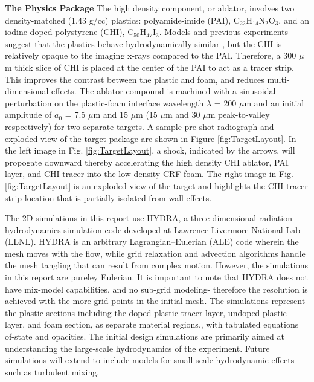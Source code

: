 \noindent \textbf{The Physics Package} The high density component, or ablator,  involves two density-matched (1.43 g/cc) plastics: polyamide-imide (PAI), C$_{22}$H$_{14}$N$_2$O$_3$, and an iodine-doped polystyrene (CHI), C$_{50}$H$_{47}$I$_3$.  Models and previous experiments suggest that the plastics behave hydrodynamically similar \cite{Nagel:2017}, but the CHI is relatively opaque to the imaging x-rays compared to the PAI.  Therefore, a 300 $\mu$m thick slice of CHI is placed at the center of the PAI to act as a tracer strip. This improves the contrast between the plastic and foam, and reduces multi-dimensional effects. The ablator compound is machined with a sinusoidal perturbation on the plastic-foam interface wavelength $\lambda$ = 200 $\mu$m and an initial amplitude of  $a_0$ =  7.5 $\mu$m and 15 $\mu$m  (15 $\mu$m and 30 $\mu$m peak-to-valley respectively) for two separate targets. A sample pre-shot radiograph and exploded view of the target package are shown in Figure \ref{fig:TargetLayout}.  In the left image in Fig. \ref{fig:TargetLayout}, a shock, indicated by the arrows, will propogate downward thereby accelerating the high density CHI ablator, PAI layer, and CHI tracer into the low density CRF foam.  The right image in Fig. \ref{fig:TargetLayout} is an exploded view of the target and highlights the CHI tracer strip location that is partially isolated from wall effects.



The 2D simulations in this report use HYDRA, a three-dimensional radiation hydrodynamics simulation code developed at Lawrence Livermore National Lab (LLNL).   HYDRA is an arbitrary Lagrangian–Eulerian (ALE) code wherein the mesh moves with the flow, while grid relaxation and advection algorithms handle the mesh tangling that can result from complex motion. However, the simulations in this report are pureley Eulerian. It is important to note that HYDRA does not have mix-model capabilities, and no sub-grid modeling- therefore the resolution is achieved with the more grid points in the initial mesh.  The simulations represent the plastic sections including the doped plastic tracer layer, undoped plastic layer, and foam section, as separate material regions,,  with tabulated equations of-state and opacities. The initial design simulations are primarily aimed at understanding the large-scale hydrodynamics of the experiment. Future simulations will extend to include models for small-scale hydrodynamic effects such as turbulent mixing. 






